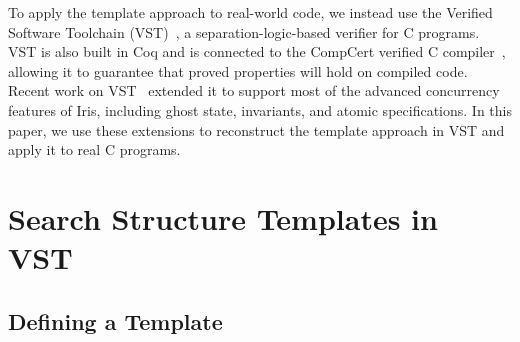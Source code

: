 \documentclass[a4paper,UKenglish,cleveref, autoref, thm-restate]{lipics-v2021}
\begin{document}
To apply the template approach to real-world code, we instead use the Verified Software Toolchain (VST)~\cite{plcc}, a separation-logic-based verifier for C programs. VST is also built in Coq and is connected to the CompCert verified C compiler~\cite{compcert}, allowing it to guarantee that proved properties will hold on compiled code. Recent work on VST~\cite{iris-vst-arxiv} extended it to support most of the advanced concurrency features of Iris, including ghost state, invariants, and atomic specifications. In this paper, we use these extensions to reconstruct the template approach in VST and apply it to real C programs. %

\section{Search Structure Templates in VST}

\subsection{Defining a Template}
\label{templates}
\end{document}
